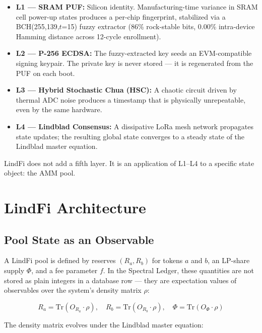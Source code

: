 \documentclass[11pt,a4paper]{article}
\begin{document}
\begin{itemize}
    \item \textbf{L1 --- SRAM PUF:} Silicon identity. Manufacturing-time variance in SRAM cell power-up states produces a per-chip fingerprint, stabilized via a BCH(255,139,$t$=15) fuzzy extractor (86\% rock-stable bits, 0.00\% intra-device Hamming distance across 12-cycle enrollment).
    \item \textbf{L2 --- P-256 ECDSA:} The fuzzy-extracted key seeds an EVM-compatible signing keypair. The private key is never stored --- it is regenerated from the PUF on each boot.
    \item \textbf{L3 --- Hybrid Stochastic Chua (HSC):} A chaotic circuit driven by thermal ADC noise produces a timestamp that is physically unrepeatable, even by the same hardware.
    \item \textbf{L4 --- Lindblad Consensus:} A dissipative LoRa mesh network propagates state updates; the resulting global state converges to a steady state of the Lindblad master equation.
\end{itemize}

LindFi does not add a fifth layer. It is an application of L1--L4 to a specific state object: the AMM pool.

\section{LindFi Architecture}

\subsection{Pool State as an Observable}

A LindFi pool is defined by reserves $(R_a, R_b)$ for tokens $a$ and $b$, an LP-share supply $\Phi$, and a fee parameter $f$. In the Spectral Ledger, these quantities are not stored as plain integers in a database row --- they are expectation values of observables over the system's density matrix $\rho$:

\begin{equation}
    R_a = \text{Tr}(O_{R_a} \cdot \rho), \quad R_b = \text{Tr}(O_{R_b} \cdot \rho), \quad \Phi = \text{Tr}(O_\Phi \cdot \rho)
    \label{eq:observables}
\end{equation}

The density matrix evolves under the Lindblad master equation:
\end{document}
